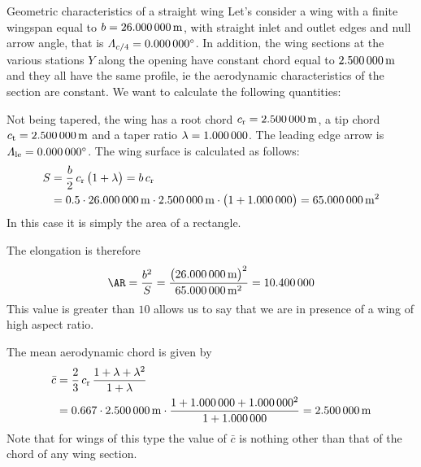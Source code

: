 \documentclass[[12pt,twoside]{book}
\begin{document}
%

%


\begin{myExampleX}{Geometric characteristics of a straight wing}{}%
\label{example:Geometric:Characteristics:Of:A:Straight:Wing}
%
\noindent
Let's consider a wing with a finite wingspan equal to $b=\SI[round-precision=1]{\mySpanWingMT}{\metre}$,
with straight inlet and outlet edges and
null arrow angle, that is $\Lambda_{c/4}=\SI[round-precision=0]{\myLambdaCQuarter}{\degree}$.
In addition, the wing sections at the various stations $Y$ along the opening have constant chord
equal to $\SI[round-precision=2]{\myChordRootWingMT}{\metre}$
and they all have the same profile, ie the aerodynamic characteristics of the section are constant.
We want to calculate the following quantities:

\noindent
{}%

\medskip
\noindent
Not being tapered, the wing has a root chord
$c_\mathrm{r}=\SI[round-precision=2]{\myChordRootWingMT}{\metre}$,
a tip chord $c_\mathrm{t}=\SI[round-precision=2]{\myChordTipWingMT}{\metre}$
and a taper ratio $\lambda=\SI[round-precision=0]{\myTaperRatioWing}{}$.
The leading edge arrow is
 $\Lambda_\mathrm{le}=\SI[round-precision=0]{\myLambdaCQuarter}{\degree}$.
\noindent
The wing surface is calculated as follows:
\[
\begin{split}
S & {}= \frac{b}{2} \, c_\mathrm{r} \, \big( 1 + \lambda \big) = b\,c_\mathrm{r}\\
  & {}=
    \num{0.5} \cdot \SI[round-precision=1]{\mySpanWingMT}{\metre}
      \cdot \SI[round-precision=2]{\myChordRootWingMT}{\metre}
      \cdot \big( 1 + \SI[round-precision=0]{\myTaperRatioWing}{} \big) 
    = { \SI[round-precision=1]{\myAreaWingMTsquared}{\metre^2} }
\end{split}
\]
In this case it is simply the area of a rectangle.

\noindent
The elongation is therefore
\[
\AR 
  = \frac{b^2}{S}
  = \frac{\big(\SI[round-precision=1]{\mySpanWingMT}{\metre}\big)^2}{\SI[round-precision=1]{\myAreaWingMTsquared}{\metre^2}}
  ={ \num[round-precision=2]{\myAspectRatioWing} }
\]
This value is greater than $\num[round-precision=0]{10}$ allows us to say that we are in
presence of a wing of high aspect ratio.


\noindent
The mean aerodynamic chord is given by
 
\[
\begin{split}
\bar{c} & {}= \frac{2}{3} \, c_\mathrm{r} \, \frac{1+\lambda + \lambda^2}{1+\lambda} \\
  & {}=
    \num{0.667} \cdot \SI[round-precision=2]{\myChordRootWingMT}{\metre}
      \cdot 
        \frac{
          1 + \SI[round-precision=0]{\myTaperRatioWing}{} + \SI[round-precision=0]{\myTaperRatioWing}{}^2
        }{
          1 + \SI[round-precision=0]{\myTaperRatioWing}{}
        }
    = \SI[round-precision=2]{\myMACWingMT}{\metre} 
\end{split}
\]
Note that for wings of this type the value of $\bar{c} $ is nothing other than that of the chord
of any wing section.


\end{myExampleX}
\end{document}
